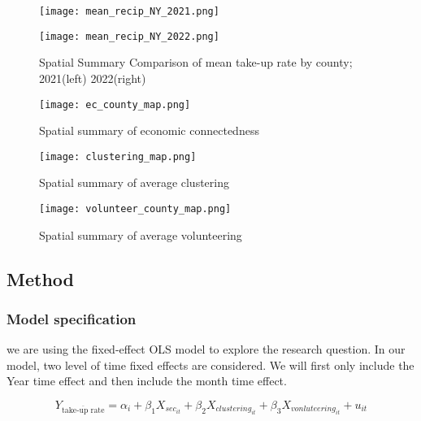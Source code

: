 \documentclass{article}
\begin{document}
\begin{figure}[h]
\begin{minipage}{0.5\textwidth}
    \centering
    \texttt{[image: mean\_recip\_NY\_2021.png]} %
  \end{minipage}\hfill
  \begin{minipage}{0.5\textwidth}
    \centering
    \texttt{[image: mean\_recip\_NY\_2022.png]} %
  \end{minipage}
  \caption{Spatial Summary Comparison of mean take-up rate by county; 2021(left) 2022(right)}
  \label{}
\end{figure}

\begin{figure}[ht]
    \centering
    \texttt{[image: ec\_county\_map.png]}
    \caption{Spatial summary of economic connectedness}
    \label{}
\end{figure}

\begin{figure}[ht]
    \centering
    \texttt{[image: clustering\_map.png]}
    \caption{Spatial summary of average clustering}
    \label{}
\end{figure}

\begin{figure}[ht]
    \centering
    \texttt{[image: volunteer\_county\_map.png]}
    \caption{Spatial summary of average volunteering}
    \label{}
\end{figure}



\newpage



\subsection{Method}

\subsubsection{Model specification}

we are using the fixed-effect OLS model to explore the research question. In our model, two level of time fixed effects are considered. We will first only include the Year time effect and then include the month time effect.

$$Y_{\overline{\text{take-up rate}}}=\alpha_i+\beta_1 X_{sec_{it}}+\beta_2 X_{clustering_{it}}+\beta_3 X_{vonluteering_{it}}+u_{it}$$
\end{document}
